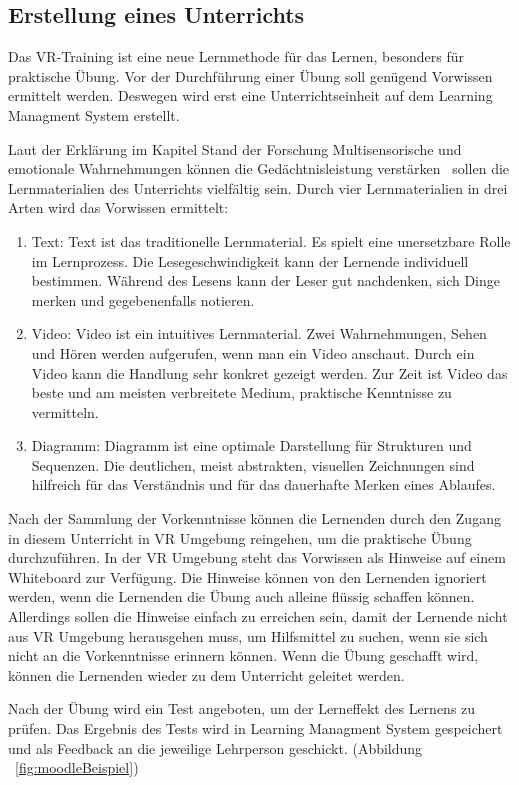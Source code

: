  \subsection{Erstellung eines Unterrichts}
 Das VR-Training ist eine neue Lernmethode für das Lernen, besonders für praktische Übung. Vor der Durchführung einer Übung soll genügend Vorwissen ermittelt werden. Deswegen wird erst eine Unterrichtseinheit auf dem Learning Managment System erstellt.

 Laut der Erklärung im Kapitel Stand der Forschung \glqq Multisensorische und emotionale Wahrnehmungen können die Gedächtnisleistung verstärken\grqq\ \citep{11} sollen die Lernmaterialien des Unterrichts vielfältig sein. Durch vier Lernmaterialien in drei Arten wird das Vorwissen ermittelt:
 \begin{enumerate}
    \item Text: Text ist das traditionelle Lernmaterial. Es spielt eine unersetzbare Rolle im Lernprozess. Die Lesegeschwindigkeit kann der Lernende individuell bestimmen. Während des Lesens kann der Leser gut nachdenken, sich Dinge merken und gegebenenfalls notieren.
    \item Video: Video ist ein intuitives Lernmaterial. Zwei Wahrnehmungen, Sehen und Hören werden aufgerufen, wenn man ein Video anschaut. Durch ein Video kann die Handlung sehr konkret gezeigt werden. Zur Zeit ist Video das beste und am meisten verbreitete Medium, praktische Kenntnisse zu vermitteln.
    \item Diagramm: Diagramm ist eine optimale Darstellung für Strukturen und Sequenzen. Die deutlichen, meist abstrakten, visuellen Zeichnungen sind hilfreich für das Verständnis und für das dauerhafte Merken eines Ablaufes.
 \end{enumerate}

 Nach der Sammlung der Vorkenntnisse können die Lernenden durch den Zugang in diesem Unterricht in VR Umgebung reingehen, um die praktische Übung durchzuführen. In der VR Umgebung steht das Vorwissen als Hinweise auf einem Whiteboard zur Verfügung. Die Hinweise können von den Lernenden ignoriert werden, wenn die Lernenden die Übung auch alleine flüssig schaffen können. Allerdings sollen die Hinweise einfach zu erreichen sein, damit der Lernende nicht aus VR Umgebung herausgehen muss, um Hilfsmittel zu suchen, wenn sie sich nicht an die Vorkenntnisse erinnern können. Wenn die Übung geschafft wird, können die Lernenden wieder zu dem Unterricht geleitet werden.

 Nach der Übung wird ein Test angeboten, um der Lerneffekt des Lernens zu prüfen. Das Ergebnis des Tests wird in Learning Managment System gespeichert und als Feedback an die jeweilige Lehrperson geschickt. (Abbildung ~\ref{fig:moodleBeispiel})
 
